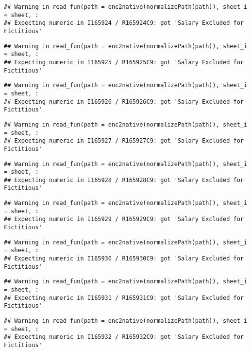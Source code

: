 \documentclass[
]{article}
\begin{document}
\begin{verbatim}
## Warning in read_fun(path = enc2native(normalizePath(path)), sheet_i = sheet, :
## Expecting numeric in I165924 / R165924C9: got 'Salary Excluded for Fictitious'
\end{verbatim}

\begin{verbatim}
## Warning in read_fun(path = enc2native(normalizePath(path)), sheet_i = sheet, :
## Expecting numeric in I165925 / R165925C9: got 'Salary Excluded for Fictitious'
\end{verbatim}

\begin{verbatim}
## Warning in read_fun(path = enc2native(normalizePath(path)), sheet_i = sheet, :
## Expecting numeric in I165926 / R165926C9: got 'Salary Excluded for Fictitious'
\end{verbatim}

\begin{verbatim}
## Warning in read_fun(path = enc2native(normalizePath(path)), sheet_i = sheet, :
## Expecting numeric in I165927 / R165927C9: got 'Salary Excluded for Fictitious'
\end{verbatim}

\begin{verbatim}
## Warning in read_fun(path = enc2native(normalizePath(path)), sheet_i = sheet, :
## Expecting numeric in I165928 / R165928C9: got 'Salary Excluded for Fictitious'
\end{verbatim}

\begin{verbatim}
## Warning in read_fun(path = enc2native(normalizePath(path)), sheet_i = sheet, :
## Expecting numeric in I165929 / R165929C9: got 'Salary Excluded for Fictitious'
\end{verbatim}

\begin{verbatim}
## Warning in read_fun(path = enc2native(normalizePath(path)), sheet_i = sheet, :
## Expecting numeric in I165930 / R165930C9: got 'Salary Excluded for Fictitious'
\end{verbatim}

\begin{verbatim}
## Warning in read_fun(path = enc2native(normalizePath(path)), sheet_i = sheet, :
## Expecting numeric in I165931 / R165931C9: got 'Salary Excluded for Fictitious'
\end{verbatim}

\begin{verbatim}
## Warning in read_fun(path = enc2native(normalizePath(path)), sheet_i = sheet, :
## Expecting numeric in I165932 / R165932C9: got 'Salary Excluded for Fictitious'
\end{verbatim}
\end{document}
